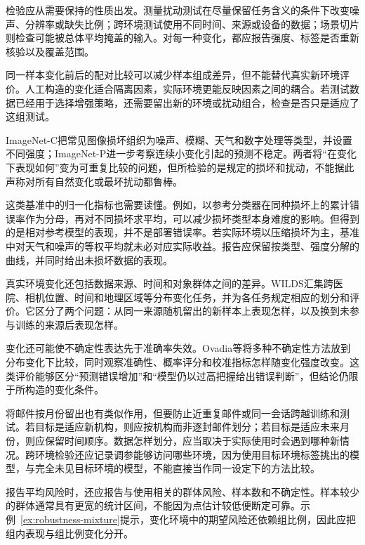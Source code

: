 检验应从需要保持的性质出发。测量扰动测试在尽量保留任务含义的条件下改变噪声、分辨率或缺失比例；跨环境测试使用不同时间、来源或设备的数据；场景切片则检查可能被总体平均掩盖的输入。对每一种变化，都应报告强度、标签是否重新核验以及覆盖范围。

同一样本变化前后的配对比较可以减少样本组成差异，但不能替代真实新环境评价。人工构造的变化适合隔离因素，实际环境更能反映因素之间的耦合。若测试数据已经用于选择增强策略，还需要留出新的环境或扰动组合，检查是否只是适应了这组测试。

ImageNet-C把常见图像损坏组织为噪声、模糊、天气和数字处理等类型，并设置不同强度；ImageNet-P进一步考察连续小变化引起的预测不稳定。两者将“在变化下表现如何”变为可重复比较的问题，但所检验的是规定的损坏和扰动，不能据此声称对所有自然变化或最坏扰动都鲁棒。

这类基准中的归一化指标也需要读懂。例如，以参考分类器在同种损坏上的累计错误率作为分母，再对不同损坏求平均，可以减少损坏类型本身难度的影响。但得到的是相对参考模型的表现，并不是部署错误率。若实际环境以压缩损坏为主，基准中对天气和噪声的等权平均就未必对应实际收益。报告应保留按类型、强度分解的曲线，并同时给出未损坏数据的表现。

真实环境变化还包括数据来源、时间和对象群体之间的差异。WILDS汇集跨医院、相机位置、时间和地理区域等分布变化任务，并为各任务规定相应的划分和评价。它区分了两个问题：从同一来源随机留出的新样本上表现怎样，以及换到未参与训练的来源后表现怎样。

\Needspace{45mm}
变化还可能使不确定性表达先于准确率失效。Ovadia等将多种不确定性方法放到分布变化下比较，同时观察准确性、概率评分和校准指标怎样随变化强度改变。这类评价能够区分“预测错误增加”和“模型仍以过高把握给出错误判断”，但结论仍限于所构造的变化条件。

将邮件按月份留出也有类似作用，但要防止近重复邮件或同一会话跨越训练和测试。若目标是适应新机构，则应按机构而非逐封邮件划分；若目标是适应未来月份，则应保留时间顺序。数据怎样划分，应当取决于实际使用时会遇到哪种新情况。跨环境检验还应记录调参能够访问哪些环境，因为使用目标环境标签挑出的模型，与完全未见目标环境的模型，不能直接当作同一设定下的方法比较。

报告平均风险时，还应报告与使用相关的群体风险、样本数和不确定性。样本较少的群体通常具有更宽的统计区间，不能因为点估计较低便断定可靠。示例~\ref{ex:robustness-mixture}提示，变化环境中的期望风险还依赖组比例，因此应把组内表现与组比例变化分开。

